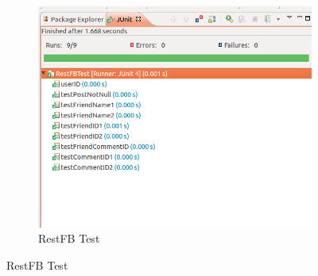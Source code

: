 \documentclass[a4paper,11pt]{article}
\begin{document}
\begin{figure}[H]
\begin{subfigure}{.5\textwidth}
  \includegraphics[scale=0.42]{APpendix/RestFBTest}
  \caption{RestFB Test}
  \label{fig:sub1}
\end{subfigure}
\end{figure}
\end{document}
